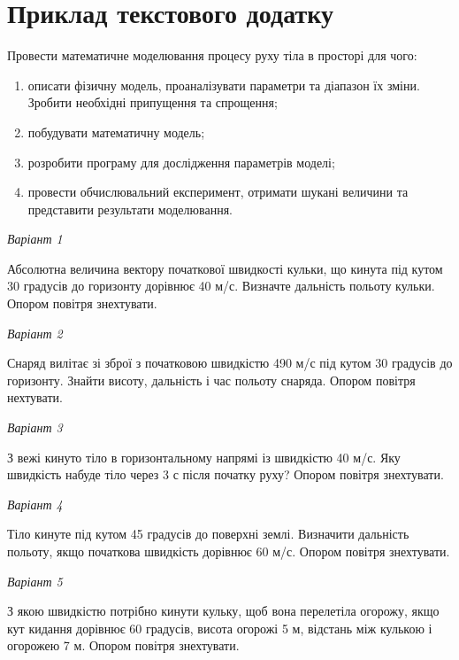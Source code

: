 \chapter[(Довідковий) Приклад текстового додатку]{Приклад текстового додатку}\label{apdx:tasks}

Провести математичне моделювання процесу руху тіла в просторі для чого:
\begin{enumerate}
\item описати фізичну модель, проаналізувати параметри та діапазон їх зміни. Зробити необхідні припущення та спрощення;
\item побудувати математичну модель;
\item розробити програму для дослідження параметрів моделі;
\item провести обчислювальний експеримент, отримати шукані величини та представити результати моделювання.
\end{enumerate}

\vspace{1em}
\textit{Варіант 1}\par
Абсолютна величина вектору початкової швидкості кульки, що кинута під кутом 30 градусів до горизонту дорівнює 40 м/с. Визначте дальність польоту кульки. Опором повітря знехтувати.

\vspace{1em}
\textit{Варіант 2}\par
Снаряд вилітає зі зброї з початковою швидкістю 490 м/с під кутом 30 градусів до горизонту. Знайти висоту, дальність і час польоту снаряда. Опором повітря нехтувати.

\vspace{1em}
\textit{Варіант 3}\par
З вежі кинуто тіло в горизонтальному напрямі із швидкістю 40 м/с. Яку швидкість набуде тіло через 3 с після початку руху? Опором повітря знехтувати.

\vspace{1em}
\textit{Варіант 4}\par
Тіло кинуте під кутом 45 градусів до поверхні землі. Визначити дальність польоту, якщо початкова швидкість дорівнює 60 м/с. Опором повітря знехтувати.

\vspace{1em}
\textit{Варіант 5}\par
З якою швидкістю потрібно кинути кульку, щоб вона перелетіла огорожу, якщо кут кидання дорівнює 60 градусів, висота огорожі 5 м, відстань між кулькою і огорожею 7 м. Опором повітря знехтувати.

